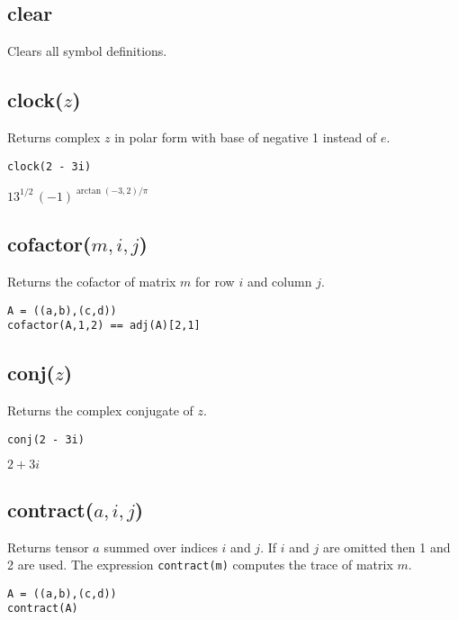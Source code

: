 \subsection*{clear}

Clears all symbol definitions.

\subsection*{clock($z$)}

Returns complex $z$ in polar form with base of negative 1 instead of $e$.

{\color{blue}
\begin{verbatim}
clock(2 - 3i)
\end{verbatim}
}

\noindent
$13^{1/2}\,(-1)^{\arctan(-3,2)/\pi}$

\subsection*{cofactor($m,i,j$)}

Returns the cofactor of matrix $m$ for row $i$ and column $j$.

{\color{blue}
\begin{verbatim}
A = ((a,b),(c,d))
cofactor(A,1,2) == adj(A)[2,1]
\end{verbatim}
}


\subsection*{conj($z$)}

Returns the complex conjugate of $z$.

{\color{blue}
\begin{verbatim}
conj(2 - 3i)
\end{verbatim}
}

\noindent
$2 + 3 i$

\subsection*{contract($a,i,j$)}

Returns tensor $a$ summed over indices $i$ and $j$.
If $i$ and $j$ are omitted then 1 and 2 are used.
The expression {\tt contract(m)} computes the trace of matrix $m$.

{\color{blue}
\begin{verbatim}
A = ((a,b),(c,d))
contract(A)
\end{verbatim}
}

